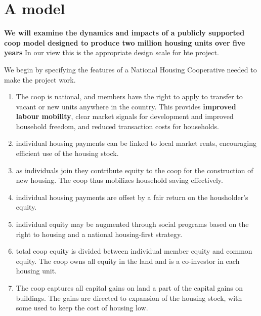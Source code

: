\newpage
\section{A model}
 \textbf{We will examine the dynamics and impacts of a publicly supported coop model designed to produce two million housing units over five years} In our view this is the appropriate design scale for hte project. 

 We begin by specifying the features of a National Housing Cooperative needed to make the project work.

 \begin{enumerate}
     \item The coop is national, and members have the right to apply to transfer to vacant or new units anywhere in the country. This provides \textbf{improved labour mobility}, clear market signals for development and improved household freedom, and reduced transaction costs for households.
     \item individual housing payments can be linked to local market rents, encouraging efficient use of the housing stock. 

     \item  as  individuals join they contribute equity to the coop for the construction of new housing. The coop thus mobilizes household saving effectively. 
 \item individual housing payments are offset by a fair return on the  housholder's equity. 
    \item individual equity may be augmented through social programs based on the right to housing and a national housing-first strategy. 
    
     \item total coop equity is divided between individual member equity and common equity. The coop owns all equity in the land and is a co-investor in each housing unit. 
     \item The coop captures all capital gains on land a part of the capital gains on buildings. The gains are directed to expansion of the housing stock, with some used to keep the cost of housing low.
     

\end{enumerate}
